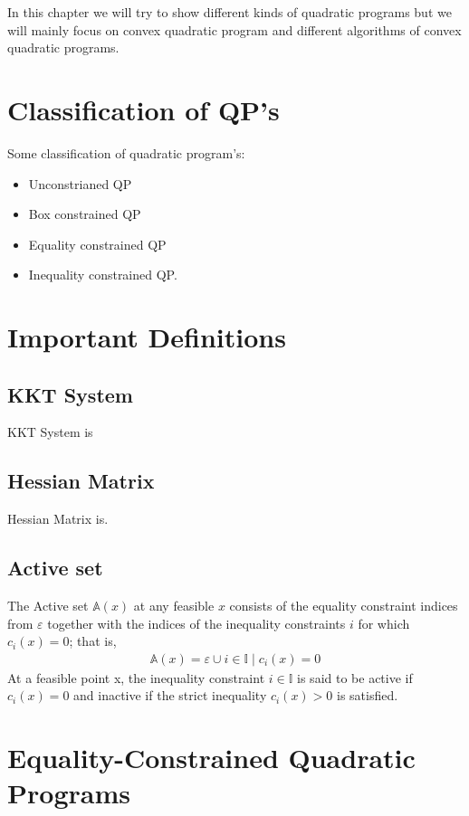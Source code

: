In this chapter we will try to show different kinds of quadratic programs but we will mainly focus on convex quadratic program and different algorithms of convex quadratic programs.

\section{Classification of QP's}

Some classification of quadratic program's:
\begin{itemize}
	\item Unconstrianed QP
	\item Box constrained QP
	\item Equality constrained QP
	\item Inequality constrained QP.
\end{itemize}

\section*{Important Definitions}
\subsection*{KKT System}
KKT System is
\subsection*{Hessian Matrix}
Hessian Matrix is.
\subsection*{Active set}
The Active set $\mathbb{A}(x)$ at any feasible $x$ consists of the equality constraint indices from $\varepsilon$ together with the indices of the inequality constraints $i$ for which $c_i(x)=0$; that is,
\begin{equation*}
	\begin{aligned}
		\mathbb{A}(x)=\varepsilon \cup {i\in \mathbb{I}\mid c_i(x)=0}
	\end{aligned}
\end{equation*}
At a feasible point x, the inequality constraint $i\in \mathbb{I}$ is said to be active if $c_i(x)=0$ and inactive if the strict inequality $c_i(x)>0$ is satisfied.

\section{Equality-Constrained Quadratic Programs}

